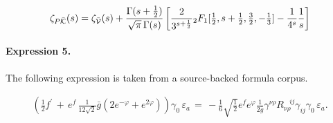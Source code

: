 \documentclass[11pt]{article}
\begin{document}
\begin{align*}{\zeta_{P\bar{\cal K}}}(s)=\zeta_{\bar{\cal V}}(s)+\frac{\Gamma(s+\frac{1}{2})}{\sqrt{\pi}\,\Gamma(s)} \left[\frac{2}{3^{s+\frac{1}{2}}} {}_2F_{1}[{\textstyle\frac{1}{2}},{s+\textstyle\frac{1}{2}},{\textstyle\frac{3}{2}},-{\textstyle\frac{1}{3}}]-\frac{1}{4^s} \frac{1}{s} \right]\end{align*}

\paragraph{Expression 5.} The following expression is taken from a source-backed formula corpus.

\begin{align*} \left(\frac{1}{2}f^{\prime}\,+\, e^f\,\frac{1}{12\sqrt{2}}\bar{g}\left(2e^{-\varphi}+e^{2\varphi}\right)\right)\gamma_0\,\varepsilon_a \,=\,-\frac{1}{6} \sqrt{\frac{1}{2}}e^fe^{\varphi}\frac{1}{2\bar{g}}\gamma^{\nu \rho}R_{\nu \rho}^{\;\;\;ij}\gamma_{ij}\gamma_0\,\varepsilon_a.\end{align*}
\end{document}
